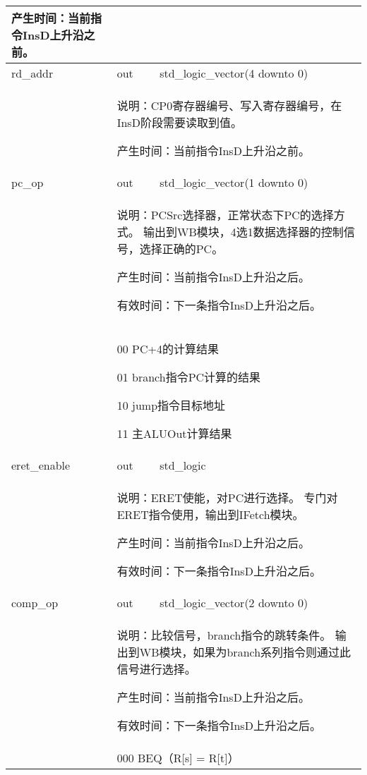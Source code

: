 \begin{tabularx}{\textwidth}{lll}
{                产生时间：当前指令InsD上升沿之前。
            } \\
            \midrule
            rd\_addr        & out       & std\_logic\_vector(4 downto 0) \\
            \cmidrule(l){2-3}
            &
            \multicolumn{2}{X}{
                说明：CP0寄存器编号、写入寄存器编号，在InsD阶段需要读取到值。

                产生时间：当前指令InsD上升沿之前。
            } \\
            \midrule
            pc\_op          & out       & std\_logic\_vector(1 downto 0) \\
            \cmidrule(l){2-3}
            &
            \multicolumn{2}{X}{
                说明：PCSrc选择器，正常状态下PC的选择方式。%
                输出到WB模块，4选1数据选择器的控制信号，选择正确的PC。

                产生时间：当前指令InsD上升沿之后。

                有效时间：下一条指令InsD上升沿之后。 
            } \\
            &
            \multicolumn{2}{X}{
                00 PC+4的计算结果

                01 branch指令PC计算的结果

                10 jump指令目标地址

                11 主ALUOut计算结果
            } \\
            \midrule
            eret\_enable    & out       & std\_logic \\

            \cmidrule(l){2-3}
            &
            \multicolumn{2}{X}{
                说明：ERET使能，对PC进行选择。%
                专门对ERET指令使用，输出到IFetch模块。

                产生时间：当前指令InsD上升沿之后。

                有效时间：下一条指令InsD上升沿之后。 
            } \\
            \midrule
            comp\_op        & out       & std\_logic\_vector(2 downto 0) \\
            \cmidrule(l){2-3}
            &
            \multicolumn{2}{X}{
                说明：比较信号，branch指令的跳转条件。%
                输出到WB模块，如果为branch系列指令则通过此信号进行选择。

                产生时间：当前指令InsD上升沿之后。

                有效时间：下一条指令InsD上升沿之后。 
            } \\
            &
            \multicolumn{2}{X}{
                000 BEQ（R[s] = R[t]）

}
\end{tabularx}
